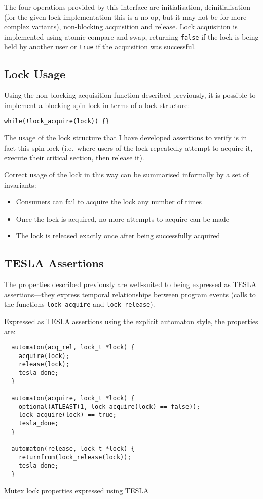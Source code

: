 The four operations provided by this interface are initialisation,
deinitialisation (for the given lock implementation this is a no-op, but it may
not be for more complex variants), non-blocking acquisition and release. Lock
acquisition is implemented using atomic compare-and-swap, returning
\texttt{false} if the lock is being held by another user or \texttt{true}
if the acquisition was successful.

\subsection{Lock Usage}

Using the non-blocking acquisition function described previously, it is possible
to implement a blocking spin-lock in terms of a lock structure:

\begin{verbatim}
while(!lock_acquire(lock)) {}
\end{verbatim}

The usage of the lock structure that I have developed assertions to verify is in
fact this spin-lock (i.e.\ where users of the lock repeatedly attempt to acquire
it, execute their critical section, then release it).

Correct usage of the lock in this way can be summarised informally by a set of
invariants:
\begin{itemize}
  \item Consumers can fail to acquire the lock any number of times
  \item Once the lock is acquired, no more attempts to acquire can be made
  \item The lock is released exactly once after being successfully acquired
\end{itemize}

\subsection{TESLA Assertions}

The properties described previously are well-suited to being expressed as TESLA
assertions---they express temporal relationships between program events (calls
to the functions \texttt{lock_acquire} and \texttt{lock_release}).

Expressed as TESLA assertions using the explicit automaton style, the properties
are:
\begin{listing}[ht]
  \begin{verbatim}
  automaton(acq_rel, lock_t *lock) {
    acquire(lock);
    release(lock);
    tesla_done;
  }

  automaton(acquire, lock_t *lock) {
    optional(ATLEAST(1, lock_acquire(lock) == false));
    lock_acquire(lock) == true;
    tesla_done;
  }

  automaton(release, lock_t *lock) {
    returnfrom(lock_release(lock));
    tesla_done;
  }
  \end{verbatim}
  \caption{Mutex lock properties expressed using TESLA}
  \label{lst:mutex-tesla}
\end{listing}

